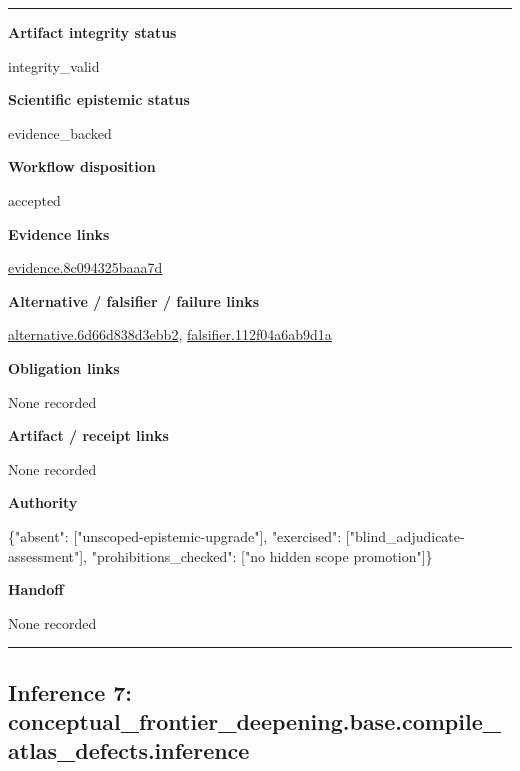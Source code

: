 \documentclass[10pt,a4paper]{article}
\newcommand{\TraceField}[2]{\par\noindent\textbf{#1}\par\noindent #2\par\smallskip}
\newenvironment{TraceDossier}{\par\medskip\noindent\hrule\medskip}{\medskip\hrule\par\medskip}
\begin{document}
\begin{TraceDossier}
\TraceField{Artifact integrity status}{integrity\_\allowbreak{}valid}

\TraceField{Scientific epistemic status}{evidence\_\allowbreak{}backed}

\TraceField{Workflow disposition}{accepted}

\TraceField{Evidence links}{\hyperlink{trace-evidence-08593d7116705ca67d}{evidence.\allowbreak{}8c094325ba\allowbreak{}aa7d}}

\TraceField{Alternative / falsifier / failure links}{\hyperlink{trace-alternative-840742575ae61bbd4a}{alternativ\allowbreak{}e.\allowbreak{}6d66d838d3\allowbreak{}ebb2}, \hyperlink{trace-alternative-f1fbffecf04f73ab9f}{falsifier.\allowbreak{}112f04a6ab\allowbreak{}9d1a}}

\TraceField{Obligation links}{None recorded}

\TraceField{Artifact / receipt links}{None recorded}

\TraceField{Authority}{\{"absent":\allowbreak{} ["unscoped\allowbreak{}-\allowbreak{}epistemic-\allowbreak{}upgrade"],\allowbreak{} "exercised\allowbreak{}":\allowbreak{} ["blind\_\allowbreak{}adjudicate\allowbreak{}-\allowbreak{}assessment\allowbreak{}"], "prohibiti\allowbreak{}ons\_\allowbreak{}checked":\allowbreak{} ["no hidden scope promotion"\allowbreak{}]\}}

\TraceField{Handoff}{None recorded}

\end{TraceDossier}
\pagebreak[2]\subsection{Inference 7: conceptual\allowbreak{}\_\allowbreak{}frontier\_\allowbreak{}deepening.\allowbreak{}base.\allowbreak{}compile\_\allowbreak{}atlas\_\allowbreak{}defects.\allowbreak{}inference}\label{trace-inference-b0aed6eb2634abdb0a}
\end{document}
